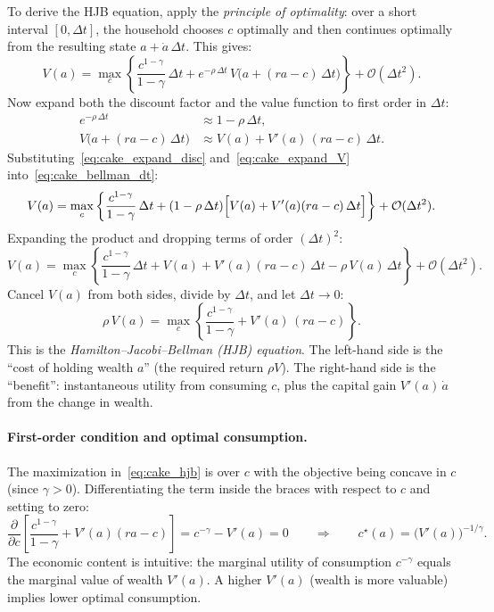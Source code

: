 \documentclass[11pt,a4paper]{report}
\begin{document}
To derive the HJB equation, apply the \emph{principle of optimality}: over a short interval $[0, \Delta t]$, the household chooses $c$ optimally and then continues optimally from the resulting state $a + \dot{a}\,\Delta t$.  This gives:
\begin{equation}
V(a) = \max_c \left\{\frac{c^{1-\gamma}}{1-\gamma}\,\Delta t + e^{-\rho\,\Delta t}\,V\!\bigl(a + (ra - c)\,\Delta t\bigr)\right\} + \mathcal{O}(\Delta t^2).
\label{eq:cake_bellman_dt}
\end{equation}
Now expand both the discount factor and the value function to first order in $\Delta t$:
\begin{align}
e^{-\rho\,\Delta t} &\approx 1 - \rho\,\Delta t, \label{eq:cake_expand_disc} \\
V\!\bigl(a + (ra - c)\,\Delta t\bigr) &\approx V(a) + V'(a)\,(ra - c)\,\Delta t. \label{eq:cake_expand_V}
\end{align}
Substituting~\eqref{eq:cake_expand_disc} and~\eqref{eq:cake_expand_V} into~\eqref{eq:cake_bellman_dt}:
\begin{equation}
V(a) = \max_c \left\{\frac{c^{1-\gamma}}{1-\gamma}\,\Delta t + (1 - \rho\,\Delta t)\Bigl[V(a) + V'(a)(ra-c)\,\Delta t\Bigr]\right\} + \mathcal{O}(\Delta t^2).
\end{equation}
Expanding the product and dropping terms of order $(\Delta t)^2$:
\begin{equation}
V(a) = \max_c \left\{\frac{c^{1-\gamma}}{1-\gamma}\,\Delta t + V(a) + V'(a)(ra-c)\,\Delta t - \rho\,V(a)\,\Delta t\right\} + \mathcal{O}(\Delta t^2).
\end{equation}
Cancel $V(a)$ from both sides, divide by $\Delta t$, and let $\Delta t \to 0$:
\begin{equation}
\boxed{\rho\, V(a) = \max_c \left\{\frac{c^{1-\gamma}}{1-\gamma} + V'(a)\,(ra - c)\right\}.}
\label{eq:cake_hjb}
\end{equation}
This is the \emph{Hamilton--Jacobi--Bellman (HJB) equation}.  The left-hand side is the ``cost of holding wealth $a$'' (the required return $\rho V$).  The right-hand side is the ``benefit'': instantaneous utility from consuming $c$, plus the capital gain $V'(a)\,\dot{a}$ from the change in wealth.

\paragraph{First-order condition and optimal consumption.}
The maximization in~\eqref{eq:cake_hjb} is over $c$ with the objective being concave in $c$ (since $\gamma > 0$).  Differentiating the term inside the braces with respect to $c$ and setting to zero:
\begin{equation}
\frac{\partial}{\partial c}\left[\frac{c^{1-\gamma}}{1-\gamma} + V'(a)(ra - c)\right]
= c^{-\gamma} - V'(a) = 0
\qquad\Longrightarrow\qquad
c^\star(a) = \bigl(V'(a)\bigr)^{-1/\gamma}.
\label{eq:cake_foc}
\end{equation}
The economic content is intuitive: the marginal utility of consumption $c^{-\gamma}$ equals the marginal value of wealth $V'(a)$.  A higher $V'(a)$ (wealth is more valuable) implies lower optimal consumption.
\end{document}
